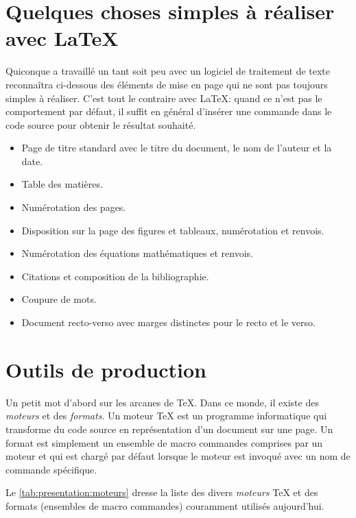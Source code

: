 \section{Quelques choses simples à réaliser avec {\LaTeX}}

Quiconque a travaillé un tant soit peu avec un logiciel de traitement
de texte reconnaîtra ci-dessous des éléments de mise en page qui ne
sont pas toujours simples à réaliser. C'est tout le contraire avec
{\LaTeX}: quand ce n'est pas le comportement par défaut, il suffit en
général d'insérer une commande dans le code source pour obtenir le
résultat souhaité.

\begin{itemize}
\item Page de titre standard avec le titre du document, le nom de
  l'auteur et la date.
\item Table des matières.
\item Numérotation des pages.
\item Disposition sur la page des figures et tableaux, numérotation et
  renvois.
\item Numérotation des équations mathématiques et renvois.
\item Citations et composition de la bibliographie.
\item Coupure de mots.
\item Document recto-verso avec marges distinctes pour le recto et le
  verso.
\end{itemize}


\section{Outils de production}

Un petit mot d'abord sur les arcanes de {\TeX}. Dans ce monde, il
existe des \emph{moteurs} et des \emph{formats}. Un moteur {\TeX} est
un programme informatique qui transforme du code source en
représentation d'un document sur une page. Un format est simplement un
ensemble de macro commandes comprises par un moteur et qui est chargé
par défaut lorsque le moteur est invoqué avec un nom de commande
spécifique.

Le \autoref{tab:presentation:moteurs} dresse la liste des divers
\emph{moteurs} {\TeX} et des formats (ensembles de macro commandes)
couramment utilisés aujourd'hui.


